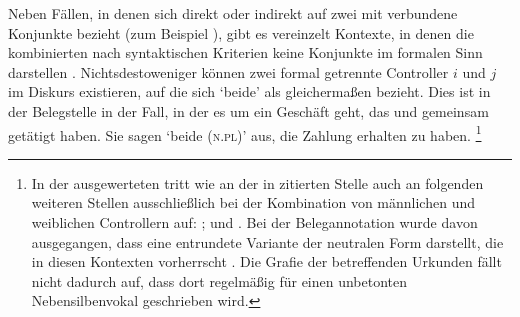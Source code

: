 Neben Fällen, in denen sich  direkt oder indirekt auf zwei mit
 verbundene Konjunkte bezieht (zum Beispiel ), gibt es vereinzelt Kontexte, in
denen die kombinierten  nach syntaktischen Kriterien keine
Konjunkte im formalen Sinn darstellen
\autocite[vgl.~auch][247--248]{askedal1973}. Nichtsdestoweniger können zwei
formal getrennte Controller $i$ und $j$ im Diskurs existieren, auf die sich
 `beide' als  gleichermaßen bezieht. Dies ist in der
Belegstelle in  der Fall, in der es um ein Geschäft
geht, das  und  gemeinsam getätigt haben. Sie sagen
 `beide (\textsc{n.pl})' aus, die Zahlung erhalten zu haben.%
%
	\footnote{In der ausgewerteten  tritt  wie an
		der in  zitierten Stelle auch an folgenden
		weiteren Stellen ausschließlich bei der Kombination von männlichen und
		weiblichen Controllern auf:
		\citet[124,23; Nr.~81, Kl.~Tennenbach, Kr.~Emmendingen, 1264]{cao1};
		\citet[205,38--39; Nr.~190, Basel, 1273]{cao1} und
		\citet[175,14; Nr.~N~230, Straßburg, 1283]{cao5}.
		Bei der Belegannotation wurde davon ausgegangen, dass
		 eine entrundete Variante der neutralen Form 
		darstellt, die in diesen Kontexten vorherrscht \autocites(siehe auch
		Anhang~\ref{sec:caoalemschwa})[vgl.][41]{paul2007}. Die Grafie der
		betreffenden Urkunden fällt nicht dadurch auf, dass dort
		regelmäßig  für einen unbetonten Nebensilbenvokal geschrieben
		wird.\label{fn:caoalemschwa}}


